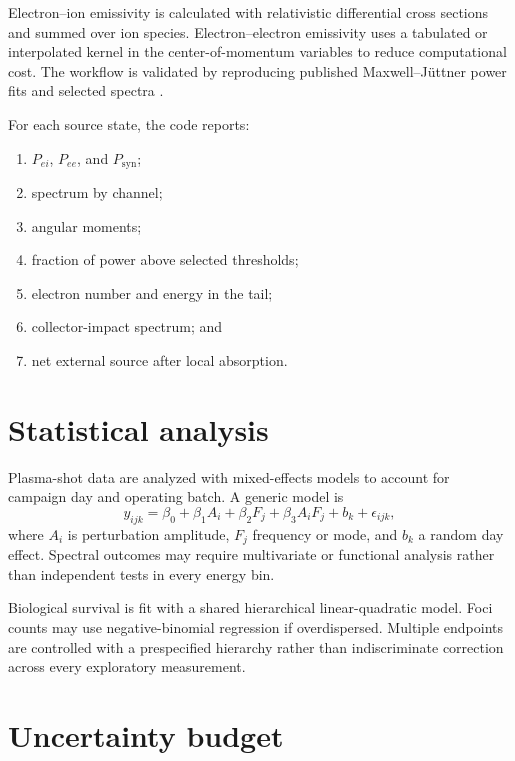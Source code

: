 Electron--ion emissivity is calculated with relativistic differential cross sections and summed over ion species. Electron--electron emissivity uses a tabulated or interpolated kernel in the center-of-momentum variables to reduce computational cost. The workflow is validated by reproducing published Maxwell--J\"uttner power fits and selected spectra \cite{haug1975,nozawa1998,munirov2023}.

For each source state, the code reports:
\begin{enumerate}
\item $P_{ei}$, $P_{ee}$, and $P_{\mathrm{syn}}$;
\item spectrum by channel;
\item angular moments;
\item fraction of power above selected thresholds;
\item electron number and energy in the tail;
\item collector-impact spectrum; and
\item net external source after local absorption.
\end{enumerate}

\section{Statistical analysis}

Plasma-shot data are analyzed with mixed-effects models to account for campaign day and operating batch. A generic model is
\begin{equation}
y_{ijk}=\beta_0+\beta_1A_i+\beta_2F_j+\beta_3A_iF_j+b_k+\epsilon_{ijk},
\end{equation}
where $A_i$ is perturbation amplitude, $F_j$ frequency or mode, and $b_k$ a random day effect. Spectral outcomes may require multivariate or functional analysis rather than independent tests in every energy bin.

Biological survival is fit with a shared hierarchical linear-quadratic model. Foci counts may use negative-binomial regression if overdispersed. Multiple endpoints are controlled with a prespecified hierarchy rather than indiscriminate correction across every exploratory measurement.

\section{Uncertainty budget}

